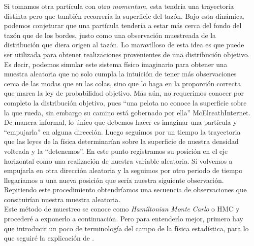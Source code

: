  Si tomamos otra partícula con otro \textit{momentum}, esta tendría una trayectoria distinta pero que también recorrería la superficie del tazón. Bajo esta dinámica, podemos conjeturar que una partícula tendería a estar más cerca del fondo del tazón que de los bordes, justo como una observación muestreada de la distribución que diera origen al tazón. Lo maravilloso de esta idea es que puede ser utilizada para obtener realizaciones provenientes de una distribución objetivo. Es decir, podemos simular este sistema físico imaginario para obtener una muestra aleatoria que no solo cumpla la intuición de tener más observaciones cerca de las modas que en las colas, sino que lo haga en la proporción correcta que marca la ley de probabilidad objetivo. Más aún, no requerimos conocer por completo la distribución objetivo, pues ``una pelota no conoce la superficie sobre la que rueda, sin embargo su camino está gobernado por ella'' {\color{red} McElreathInternet}.\\ 
 
 De manera informal, lo único que debemos hacer es imaginar una partícula y ``empujarla'' en alguna dirección. Luego seguimos por un tiempo la trayectoria que las leyes de la física determinarían sobre la superficie de nuestra densidad volteada y la ``detenemos''. En este punto registramos su posición en el eje horizontal como una realización de nuestra variable aleatoria. Si volvemos a empujarla en otra dirección aleatoria y la seguimos por otro periodo de tiempo llegaríamos a una nueva posición que sería nuestra siguiente observación. Repitiendo este procedimiento obtendríamos una secuencia de observaciones que consituirían nuestra muestra aleatoria.\\ 
 
 Este método de muestreo se conoce como \textit{Hamiltonian Monte Carlo} o HMC y procederé a exponerlo a continuación. Pero para entenderlo mejor, primero hay que introducir un poco de terminología del campo de la física estadística, para lo que seguiré la explicación de \textcite{Neal93}.\\
 
